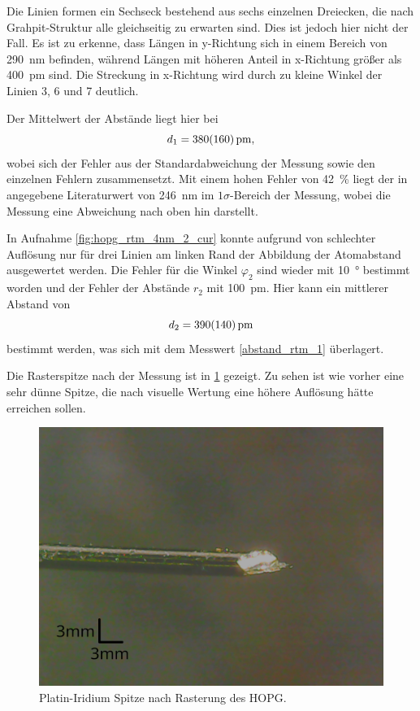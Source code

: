 Die Linien formen ein Sechseck bestehend aus sechs einzelnen Dreiecken, die nach Grahpit-Struktur alle 
gleichseitig zu erwarten sind. Dies ist jedoch hier nicht der Fall. Es ist zu erkenne, dass Längen 
in y-Richtung sich in einem Bereich von \SI{290}{\nm} befinden, während Längen mit höheren Anteil 
in x-Richtung größer als \SI{400}{\pm} sind. Die Streckung in x-Richtung wird durch zu kleine Winkel 
der Linien 3, 6 und 7 deutlich.\par 
Der Mittelwert der Abstände liegt hier bei 
\begin{equation}
	d_1 = \SI{380\pm 160}{\pm}, 
	\label{abstand_rtm_1}
\end{equation}
wobei sich der Fehler aus der Standardabweichung der Messung sowie den einzelnen Fehlern zusammensetzt. 
Mit einem hohen Fehler von \SI{42}{\percent} liegt der in \cite{skript} angegebene Literaturwert von 
\SI{246}{\nm}
im $1\sigma$-Bereich der Messung, wobei die Messung eine Abweichung nach oben hin darstellt.\\\par 

In Aufnahme \ref{fig:hopg_rtm_4nm_2_cur} konnte aufgrund von schlechter Auflösung 
nur für drei Linien am linken Rand der Abbildung der Atomabstand ausgewertet werden. Die Fehler für 
die Winkel $\varphi_2$ sind wieder mit \SI{10}{\degree} bestimmt worden und der 
Fehler der Abstände $r_2$ mit \SI{100}{\pm}. Hier kann ein mittlerer Abstand von 
\begin{equation}
	d_2 = \SI{390\pm140}{\pm}
	\label{abstand_rtm_2}
\end{equation}
bestimmt werden, was sich mit dem Messwert \ref{abstand_rtm_1} überlagert.



Die Rasterspitze nach der Messung ist in \cref{fig:spitze_hopg_nachher} gezeigt. Zu sehen ist 
wie vorher eine sehr dünne Spitze, die nach visuelle Wertung eine höhere Auflösung hätte erreichen sollen.

\begin{figure}[htb]
	\centering
	\includegraphics[width=0.5\linewidth]{figs/spitze_hopg_nachher_v2}
	\caption{Platin-Iridium Spitze nach Rasterung des HOPG.}
	\label{fig:spitze_hopg_nachher}
\end{figure}

